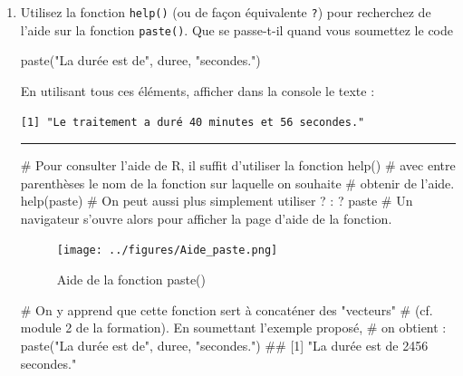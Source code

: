 \documentclass[12pt,twosided, notitlepage]{book}
\newenvironment{Shaded}{}{}
\newcommand{\KeywordTok}[1]{\textcolor[rgb]{0.00,0.00,1.00}{#1}}
\newcommand{\StringTok}[1]{\textcolor[rgb]{0.00,0.50,0.50}{#1}}
\newcommand{\CommentTok}[1]{\textcolor[rgb]{0.00,0.50,0.00}{#1}}
\newcommand{\NormalTok}[1]{#1}
\newif \ifsol
\renewenvironment{Shaded}{\begin{snugshade}}{\end{snugshade}}
\begin{document}
\begin{enumerate}
  \bigskip  \fi 
\item
  Utilisez la fonction \texttt{help()} (ou de façon équivalente
  \texttt{?}) pour recherchez de l'aide sur la fonction
  \texttt{paste()}.
  Que se passe-t-il quand vous soumettez le code

\begin{Shaded}
\begin{Highlighting}[]
\KeywordTok{paste}\NormalTok{(}\StringTok{"La durée est de"}\NormalTok{, duree, }\StringTok{"secondes."}\NormalTok{)}
\end{Highlighting}
\end{Shaded}

  En utilisant tous ces éléments, afficher dans la console le texte :

\begin{verbatim}
[1] "Le traitement a duré 40 minutes et 56 secondes."
\end{verbatim}

  \ifsol 

  \begin{center} \rule{0.5\linewidth}{\linethickness}\end{center}

\begin{Shaded}
\begin{Highlighting}[]
\CommentTok{# Pour consulter l'aide de R, il suffit d'utiliser la fonction help()}
\CommentTok{# avec entre parenthèses le nom de la fonction sur laquelle on souhaite}
\CommentTok{# obtenir de l'aide. }
\KeywordTok{help}\NormalTok{(paste)}
\CommentTok{# On peut aussi plus simplement utiliser ? :}
\NormalTok{? paste}
\CommentTok{# Un navigateur s'ouvre alors pour afficher la page d'aide de la fonction.}
\end{Highlighting}
\end{Shaded}

  \begin{figure}
  \centering
  \texttt{[image: ../figures/Aide\_paste.png]}
  \caption{Aide de la fonction paste()}
  \end{figure}

\begin{Shaded}
\begin{Highlighting}[]
\CommentTok{# On y apprend que cette fonction sert à concaténer des "vecteurs"}
\CommentTok{# (cf. module 2 de la formation). En soumettant l'exemple proposé,}
\CommentTok{# on obtient :}
\KeywordTok{paste}\NormalTok{(}\StringTok{"La durée est de"}\NormalTok{, duree, }\StringTok{"secondes."}\NormalTok{)}
\NormalTok{  ## [1] "La durée est de 2456 secondes."}


\end{Highlighting}
\end{Shaded}
\end{enumerate}
\end{document}
